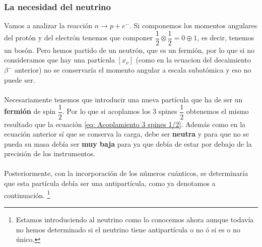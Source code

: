 \subsubsection{La necesidad del neutrino}
Vamos a analizar la reacción $n \longrightarrow p+e^-$. Si componemos los momentos angulares del protón y del electrón tenemos que componer $\dfrac{1}{2}\otimes \dfrac{1}{2}=0\oplus 1$, es decir, tenemos un bosón. Pero hemos partido de un neutrón, que es un fermión, por lo que si no consideramos que hay una partícula $[x_\nu]$ (como en la ecuacion del decaimiento $\beta^-$ anterior) no se conservaría el momento angular a escala subatómica y eso no puede ser.\\\\
Necesariamente tenemos que introducir una nueva partícula que ha de ser un \textbf{fermión} de spin $\dfrac{1}{2}$. Por lo que si acoplamos los 3 spines $\dfrac{1}{2}$ obtenemos el mismo resultado que la ecuación \ref{eq: Acoplamiento 3 spines 1/2}. Además como en la ecuación anterior sí que se conserva la carga, debe ser \textbf{neutra} y para que no se pueda su masa debía ser \textbf{muy baja} para ya que debía de estar por debajo de la precisión de los instrumentos. \\\\Posteriormente, con la incorporación de los números cuánticos, se determinaría que esta partícula debía ser una antipartícula, como ya denotamos a continuación. \footnote{Estamos introduciendo al neutrino como lo conocemos ahora aunque todavía no hemos determinado si el neutrino tiene antipartícula o no ó si es o no único.}
